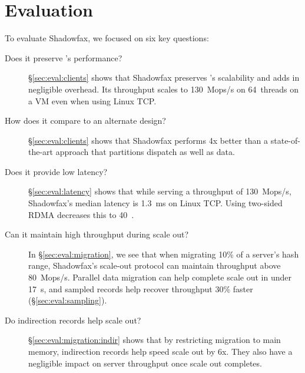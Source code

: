 \section{Evaluation}
\label{sec:eval}

To evaluate Shadowfax, we focused on six key questions:
\begin{description}
\item[Does it preserve \faster{}'s performance?]
  \S\ref{sec:eval:clients} shows that Shadowfax preserves \faster{}'s
  scalability and adds in negligible overhead.
%
  Its throughput scales to 130~Mops/s on 64~threads on a VM even when using
  Linux TCP.

\item[How does it compare to an alternate design?]
  \S\ref{sec:eval:clients} shows that Shadowfax performs 4x better than
  a state-of-the-art approach that partitions dispatch as well as data.

\item[Does it provide low latency?]
  \S\ref{sec:eval:latency} shows that while serving a throughput of 130~Mops/s,
  Shadowfax's median latency is 1.3~ms on Linux TCP.
%
  Using two-sided RDMA decreases this to 40~\us.

\item[Can it maintain high throughput during scale out?]
  In \S\ref{sec:eval:migration}, we see that when migrating 10\% of a server's
  hash range, Shadowfax's scale-out protocol can maintain throughput
  above 80~Mops/s.
%
  Parallel data migration can help complete scale out in under 17~s,
  and sampled records help recover throughput 30\% faster
  (\S\ref{sec:eval:sampling}).

%

\item[Do indirection records help scale out?]
  \S\ref{sec:eval:migration:indir} shows
  that by restricting migration to main memory, indirection records help
  speed scale out by 6x.
%
  They also have a negligible impact on server throughput once scale out
  completes.
%
%


\end{description}
